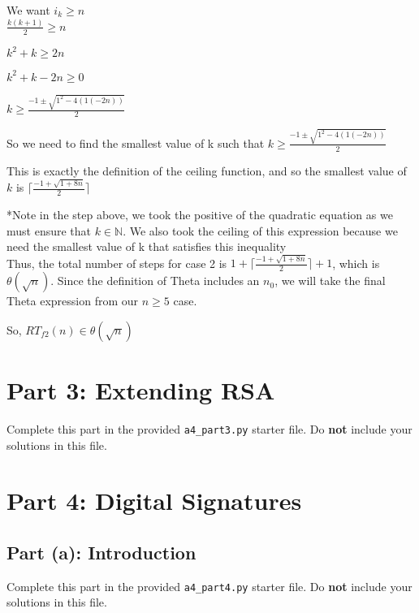 \documentclass[11pt]{article}
\begin{document}
\begin{enumerate}
We want $i_k \ge n$ \\

$\frac{k(k+1)}{2} \ge n$

$k^2 + k \ge 2n$

$k^2 + k - 2n \ge 0$

$k \ge \frac{-1 \pm \sqrt{1^2 - 4(1(-2n))}}{2}$ 


So we need to find the smallest value of k such that $k \ge \frac{-1 \pm \sqrt{1^2 - 4(1(-2n))}}{2}$ 

This is exactly the definition of the ceiling function, and so the smallest value of $k$ is $\lceil \frac{-1 + \sqrt{1 + 8n}}{2} \rceil$ 

*Note in the step above, we took the positive of the quadratic equation as we must ensure that $k\in \mathbb{N}$. We also took the ceiling of this expression because we need the smallest value of k that satisfies this inequality \\

Thus, the total number of steps for case 2 is $1 + \lceil \frac{-1 + \sqrt{1 + 8n}}{2} \rceil + 1$, which is $\theta (\sqrt{n})$. Since the definition of Theta includes an $n_0$, we will take the final Theta expression from our $n \ge 5$ case. 

So, $RT_{f2}(n)\in \theta (\sqrt{n})$



\end{enumerate}

\newpage

\section*{Part 3: Extending RSA}

Complete this part in the provided \texttt{a4\_part3.py} starter file.
Do \textbf{not} include your solutions in this file.

\section*{Part 4: Digital Signatures}

\subsection*{Part (a): Introduction}

Complete this part in the provided \texttt{a4\_part4.py} starter file.
Do \textbf{not} include your solutions in this file.
\end{document}
